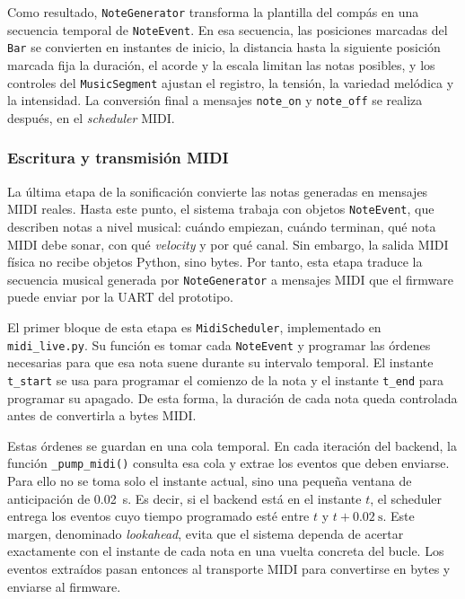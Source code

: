 \documentclass[../main.tex]{subfiles}
\begin{document}
Como resultado, \texttt{NoteGenerator} transforma la plantilla del compás en una secuencia temporal de \texttt{NoteEvent}. En esa secuencia, las posiciones marcadas del \texttt{Bar} se convierten en instantes de inicio, la distancia hasta la siguiente posición marcada fija la duración, el acorde y la escala limitan las notas posibles, y los controles del \texttt{MusicSegment} ajustan el registro, la tensión, la variedad melódica y la intensidad. La conversión final a mensajes \texttt{note\_on} y \texttt{note\_off} se realiza después, en el \textit{scheduler} MIDI.


\subsubsection{Escritura y transmisión MIDI}

La última etapa de la sonificación convierte las notas generadas en mensajes MIDI reales. Hasta este punto, el sistema trabaja con objetos \texttt{NoteEvent}, que describen notas a nivel musical: cuándo empiezan, cuándo terminan, qué nota MIDI debe sonar, con qué \textit{velocity} y por qué canal. Sin embargo, la salida MIDI física no recibe objetos Python, sino bytes. Por tanto, esta etapa traduce la secuencia musical generada por \texttt{NoteGenerator} a mensajes MIDI que el firmware puede enviar por la UART del prototipo.

El primer bloque de esta etapa es \texttt{MidiScheduler}, implementado en \texttt{midi\_live.py}. Su función es tomar cada \texttt{NoteEvent} y programar las órdenes necesarias para que esa nota suene durante su intervalo temporal. El instante \texttt{t\_start} se usa para programar el comienzo de la nota y el instante \texttt{t\_end} para programar su apagado. De esta forma, la duración de cada nota queda controlada antes de convertirla a bytes MIDI.

Estas órdenes se guardan en una cola temporal. En cada iteración del backend, la función \texttt{\_pump\_midi()} consulta esa cola y extrae los eventos que deben enviarse. Para ello no se toma solo el instante actual, sino una pequeña ventana de anticipación de \SI{0.02}{\second}. Es decir, si el backend está en el instante \(t\), el scheduler entrega los eventos cuyo tiempo programado esté entre \(t\) y \(t+\SI{0.02}{\second}\). Este margen, denominado \textit{lookahead}, evita que el sistema dependa de acertar exactamente con el instante de cada nota en una vuelta concreta del bucle. Los eventos extraídos pasan entonces al transporte MIDI para convertirse en bytes y enviarse al firmware.
\end{document}

